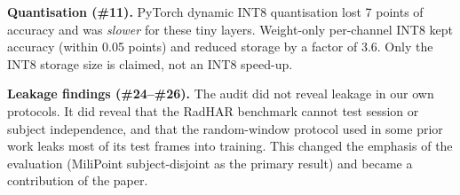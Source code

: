 \textbf{Quantisation (\#11).} PyTorch dynamic INT8 quantisation lost 7 points of
accuracy and was \emph{slower} for these tiny layers. Weight-only per-channel
INT8 kept accuracy (within 0.05 points) and reduced storage by a factor of 3.6.
Only the INT8 storage size is claimed, not an INT8 speed-up.

\textbf{Leakage findings (\#24--\#26).} The audit did not reveal leakage in our
own protocols. It did reveal that the RadHAR benchmark cannot test session or
subject independence, and that the random-window protocol used in some prior work
leaks most of its test frames into training. This changed the emphasis of the
evaluation (MiliPoint subject-disjoint as the primary result) and became a
contribution of the paper.
